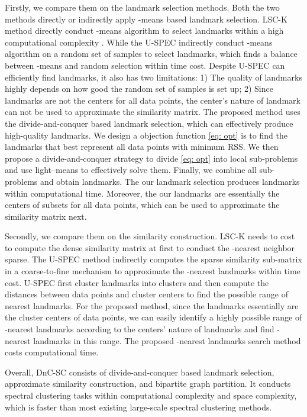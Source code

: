 \documentclass[a4paper,fleqn]{cas-dc}
\begin{document}
Firstly, we compare them on the landmark selection methods.
Both the two methods \cite{cai2014large, huang2019ultra} directly or indirectly apply -means based landmark selection.
LSC-K method \cite{cai2014large} directly conduct -means algorithm to select landmarks within a high computational complexity .
While the U-SPEC \cite{huang2019ultra} indirectly conduct -means algorithm on a random set of samples to select landmarks, which finds a balance between -means and random selection within  time cost. 
Despite U-SPEC can efficiently find landmarks, it also has two limitations:
1) The quality of landmarks highly depends on how good the random set of samples is set up;
2) Since landmarks are not the centers for all data points, the center's nature of landmark can not be used to approximate the similarity matrix.
The proposed method uses the divide-and-conquer based landmark selection, which can effectively produce high-quality landmarks. 
We design a objection function \eqref{eq: opt} is to find the landmarks that best represent all data points with minimum RSS.
We then propose a divide-and-conquer strategy to divide \eqref{eq: opt} into local sub-problems and use light--means to effectively solve them.
Finally, we combine all sub-problems and obtain landmarks.
The our landmark selection produces landmarks within  computational time.
Moreover, the our landmarks are essentially the centers of subsets for all data points, which can be used to approximate the similarity matrix next.

Secondly, we compare them on the similarity construction.
LSC-K needs to cost  to compute the dense similarity matrix at first to conduct the -nearest neighbor sparse.
The U-SPEC method indirectly computes the sparse similarity sub-matrix in a coarse-to-fine mechanism to approximate the -nearest landmarks within  time cost.
U-SPEC first cluster  landmarks into  clusters and then compute the distances between data points and  cluster centers to find the possible range of nearest landmarks.
For the proposed method, since the landmarks essentially are the cluster centers of data points, we can easily identify a highly possible range of -nearest landmarks according to the centers' nature of landmarks and find -nearest landmarks in this range. 
The proposed -nearest landmarks search method costs  computational time.

Overall, DnC-SC consists of divide-and-conquer based landmark selection, approximate similarity construction, and bipartite graph partition.
It conducts spectral clustering tasks within  computational complexity and  space complexity, which is faster than most existing large-scale spectral clustering methods.  
\end{document}
